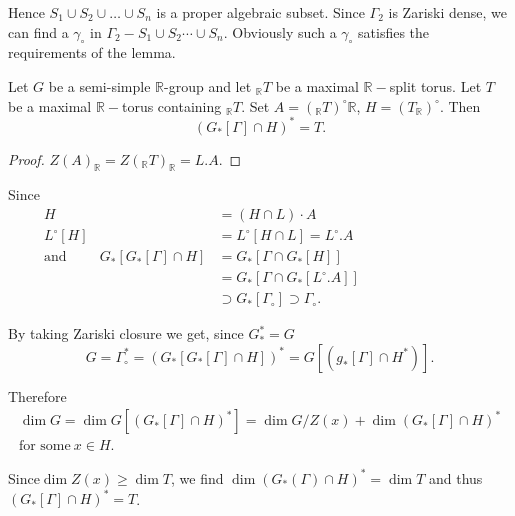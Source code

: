Hence $S_1\cup  S_2\cup \ldots \cup S_n$ is a proper algebraic subset. Since
$\Gamma_2$ is Zariski dense, we can find a $\gamma_\circ$ in $\Gamma_2-
S_1 \cup S_2 \cdots \cup S_n$. Obviously such a $\gamma_\circ$
satisfies the requirements of the lemma.

\begin{lemma} \label{chap4:lem4.5}
  Let $G$ be a semi-simple $\mathbb{R}$-group and let ${}_\mathbb{R}T$
  be a maximal $\mathbb{R}-$split torus. Let $T$ be a maximal
  $\mathbb{R}-$torus containing ${}_\mathbb{R}T$. Set $A =
  ({}_\mathbb{R}T)^\circ \mathbb{R}$, $H= (T_{\mathbb{R}})^\circ$. Then
  $$
  (G_* [\Gamma] \cap H)^* =T.
  $$
\end{lemma}

\begin{proof}
  $Z(A)_{\mathbb{R}}= Z(_{\mathbb{R}}T)_{\mathbb{R}}= L.A$.
\end{proof}

Since
\begin{align*}
  H & = (H \cap L) \cdot A\\
  L^\circ [H] & = L^\circ [H \cap L] = L^\circ. A\\
  \text{and} \hspace{1cm} G_* [G_* [\Gamma] \cap H] & = G_* [\Gamma
    \cap G_* [H]]\hspace{4cm}\\
  & = G_* [\Gamma \cap G_* [L^\circ. A]]\\
  & \supset G_* [\Gamma_\circ] \supset \Gamma_\circ.
\end{align*}

By taking Zariski closure we get, since $G^*_* = G$
$$
G= \Gamma^*_\circ = (G_* [G_* [\Gamma]\cap H])^* = G [(g_*[\Gamma]
  \cap H^*)].
$$

Therefore
\begin{multline*}
  \dim G =\dim G [(G_* [\Gamma]\cap H)^*] 
  = \dim G/{Z(x)} + \dim (G_* [\Gamma] \cap H)^*\\
  \text{for some}~ x \in H.
\end{multline*}

Since\pageoriginale $\dim Z(x) \geq \dim T$, we find $\dim (G_* (\Gamma) \cap H)^* =
\dim T$ and thus $(G_* [\Gamma]\cap H)^*=T$.
